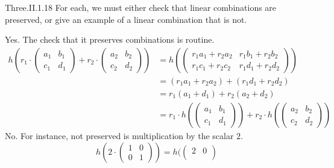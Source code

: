 \begin{ans}{Three.II.1.18}
      For each, we must either check that linear combinations
      are preserved, or give an example of a linear combination that is
      not.
      \begin{exparts*}
        \partsitem Yes.
           The check that it preserves combinations is routine.
           \begin{align*}
             h(r_1\cdot\begin{pmatrix}
                 a_1  &b_1  \\
                 c_1  &d_1
               \end{pmatrix}
              +r_2\cdot\begin{pmatrix}
                 a_2  &b_2  \\
                 c_2  &d_2
               \end{pmatrix})
              &=h(\begin{pmatrix}
                 r_1a_1+r_2a_2  &r_1b_1+r_2b_2  \\
                 r_1c_1+r_2c_2  &r_1d_1+r_2d_2
               \end{pmatrix})                    \\
              &=(r_1a_1+r_2a_2)+(r_1d_1+r_2d_2)    \\
              &=r_1(a_1+d_1)+r_2(a_2+d_2)          \\
              &=r_1\cdot h(\begin{pmatrix}
                             a_1  &b_1  \\
                             c_1  &d_1
                            \end{pmatrix})
                +r_2\cdot h(\begin{pmatrix}
                             a_2  &b_2  \\
                             c_2  &d_2
                            \end{pmatrix})
           \end{align*}
        \partsitem No.
          For instance, not preserved is multiplication by the scalar $2$.
          \begin{equation*}
            h(2\cdot\begin{pmatrix}
                1  &0  \\
                0  &1
              \end{pmatrix})
            =h(\begin{pmatrix}
                2  &0  \\

\end{pmatrix}
\end{equation*}
\end{exparts*}
\end{ans}
